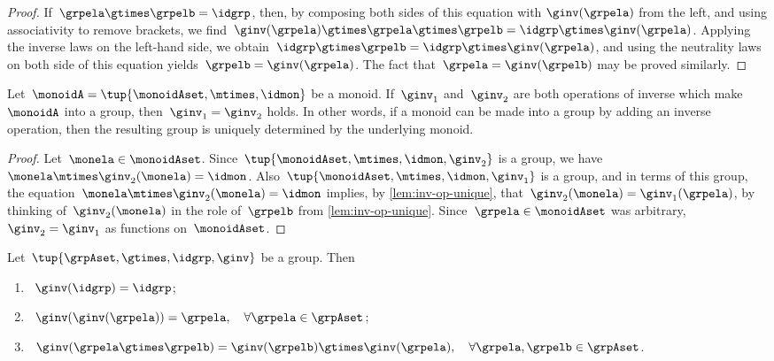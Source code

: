 \begin{proof}
    If~$\grpela \gtimes \grpelb = \idgrp$, then, by composing both sides of this equation with $\ginv(\grpela)$ from the left, and using associativity to remove brackets, we find~$\ginv(\grpela) \gtimes \grpela \gtimes \grpelb = \idgrp \gtimes \ginv(\grpela)$.
    Applying the inverse laws on the left-hand side, we obtain~$\idgrp \gtimes \grpelb = \idgrp \gtimes \ginv(\grpela)$, and using the neutrality laws on both side of this equation yields~$\grpelb =  \ginv(\grpela)$.
    The fact that~$\grpela = \ginv(\grpelb)$ may be proved similarly.
\end{proof}

\begin{corollary}
    \label{cor:inv-op-unique}
    Let~$\monoidA = \tup{\monoidAset, \mtimes,  \idmon }$ be a monoid.
    If~$\ginv_1$ and~$\ginv_2$ are both operations of inverse which make~$\monoidA$ into a group, then~$\ginv_1 =\ginv_2$ holds.
    In other words, if a monoid can be made into a group by adding an inverse operation, then the resulting group is uniquely determined by the underlying monoid.
\end{corollary}

\begin{proof}
    Let~$\monela \in \monoidAset$.
    Since~$\tup{\monoidAset, \mtimes,  \idmon, \ginv_2 }$ is a group, we have~$\monela \mtimes \ginv_2(\monela) = \idmon$.
    Also~$\tup{\monoidAset, \mtimes,  \idmon, \ginv_1}$ is a group, and in terms of this group, the equation~$\monela \mtimes \ginv_2(\monela) = \idmon$ implies, by \cref{lem:inv-op-unique}, that~$\ginv_2(\monela) = \ginv_1(\grpela)$, by thinking of~$\ginv_2(\monela)$ in the role of~$\grpelb$ from \cref{lem:inv-op-unique}.
    Since~$\grpela \in \monoidAset$ was arbitrary,~$\ginv_2 = \ginv_1$ as functions on~$\monoidAset$.
\end{proof}

\begin{lemma}
    \label{lem:inv-op-properties}
    Let~$\tup{\grpAset, \gtimes, \idgrp, \ginv}$ be a group.
    Then
    \begin{enumerate}
        \item\label{eq:group-neutral-invariant}~$\ginv(\idgrp) = \idgrp$;
        \item\label{eq:group-inverse-inverse}~$ \ginv(\ginv(\grpela)) = \grpela, \quad \forall \grpela \in \grpAset$;
        \item\label{eq:group-inverse-of-composition}~$\ginv(\grpela \gtimes \grpelb ) = \ginv(\grpelb) \gtimes \ginv(\grpela), \quad \forall \grpela, \grpelb \in \grpAset$.
    \end{enumerate}
\end{lemma}

